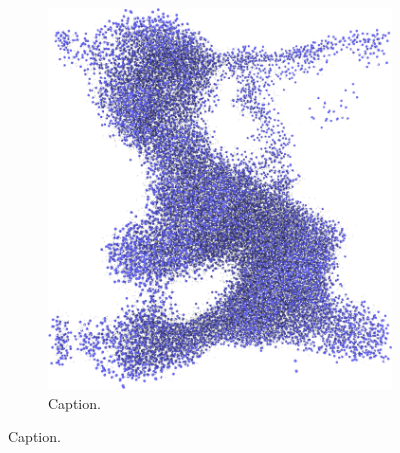 \begin{figure}[htpb]
\begin{subfigure}[b]{\myfigwidth}
        \includegraphics[width=\textwidth]{images/systems/trimmed-rough_fracture03_08}%
        \caption{Caption.}%
    \end{subfigure}%
    \caption{%
        Caption. %
    }%
\end{figure}%

